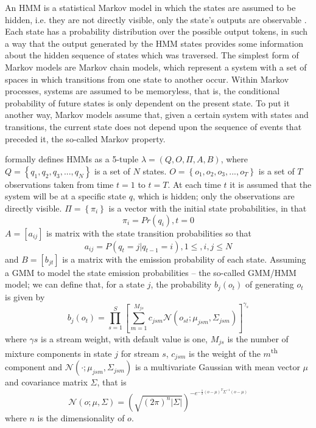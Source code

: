An \ac{HMM} is a statistical Markov model in which the states are assumed to be hidden, i.e. they are
not directly visible, only the state's outputs are observable \cite{Fink2014}. Each state has a probability distribution over the possible output tokens, in such a way that the output generated by the HMM states provides some information about the hidden sequence of states which was traversed.  The simplest form of Markov models are Markov chain models, 
which represent a system with a set of spaces in which transitions from one state to another occur. 
Within Markov processes, systems are assumed to be memoryless, that is, the conditional probability
of future states is only dependent on the present state. To put it another way, Markov models assume that,
given a certain system with states and transitions, the current state does not depend upon the 
sequence of events that preceded it, the so-called Markov property. 

\citet{Kohlschein2006} \cite{Kohlschein2006} formally defines \ac{HMM}s as a 5-tuple $\lambda = \left (Q, O, \Pi, A, B\right )$, where $Q = \left \{q_1, q_2, q_3, ..., q_N\right \}$  is a set of $N$ states. $O = \left \{o_1, o_2, o_3, ..., o_T\right \}$ is a set of $T$ observations taken from time $t = 1$ to $t = T$. At each time $t$ it is assumed that the system will be at a specific state $q$, which is hidden; only the observations are directly visible. $\Pi = \left \{\pi_i \right \}$ is a vector with the initial state probabilities, in that
\begin{equation}
\pi_i = Pr(q_i), t = 0
\end{equation}
$A = [a_{ij}]$ is matrix with the state transition probabilities so that
\begin{equation}
a_{ij} = P(q_t = j | q_{t-1} = i),  1 \leq, i, j \leq N
\end{equation}
and $B = [b_{jt}]$ is a matrix with the emission probability of each state. Assuming a \ac{GMM} to model the state emission probabilities -- the so-called GMM/HMM model; we can define that, for a state $j$, the probability $b_j(o_t)$ of generating $o_t$ is given by
\begin{equation}
 b_j(o_t) = \prod_{s=1}^{S}\left [ \sum_{m=1}^{M_{js}} c_{jsm}\mathcal{N}(o_{st}; \mu_{jsm}, \Sigma_{jsm}) \right ]^{\gamma_s}
\end{equation}
where $\gamma s$ is a stream weight, with default value is one, $M_{js}$ is the number of mixture components in state $j$ for stream $s$, $c_{jsm}$ is the weight of the $m$\textsuperscript{th} component and $\mathcal{N}(\cdot; \mu_{jsm}, \Sigma_{jsm})$ is a multivariate Gaussian with mean vector $\mu$ and covariance matrix $\Sigma$, that is
\begin{equation}
 \mathcal{N}(o; \mu, \Sigma) = (\sqrt{(2\pi)^{n}\left |\Sigma\right |})^{-e^{-\frac{1}{2}(o-\mu)^{T}\Sigma^{-1}(o-\mu)}}
\end{equation}
where $n$ is the dimensionality of $o$.

